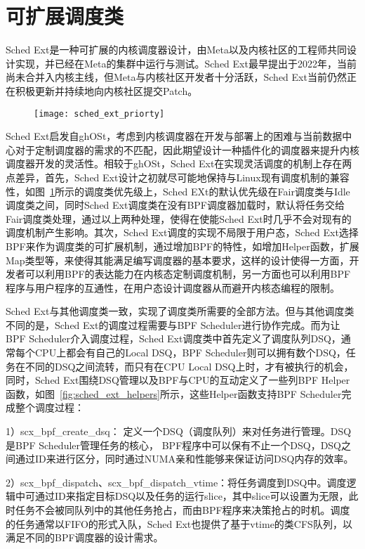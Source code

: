\section{可扩展调度类}

Sched Ext是一种可扩展的内核调度器设计\citep{schedext}，由Meta以及内核社区的工程师共同设计实现，并已经在Meta的集群中运行与测试。Sched Ext最早提出于2022年，当前尚未合并入内核主线，但Meta与内核社区开发者十分活跃，Sched Ext当前仍然正在积极更新并持续地向内核社区提交Patch。

\begin{figure}[!htbp]
    \centering
    \texttt{[image: sched\_ext\_priorty]}
    \label{fig:sched_ext_priorty}
\end{figure}

Sched Ext启发自ghOSt\citep{humphries2021ghost}，考虑到内核调度器在开发与部署上的困难与当前数据中心对于定制调度器的需求的不匹配，因此期望设计一种插件化的调度器来提升内核调度器开发的灵活性。相较于ghOSt，Sched Ext在实现灵活调度的机制上存在两点差异，首先，Sched Ext设计之初就尽可能地保持与Linux现有调度机制的兼容性，如图~\ref{fig:sched_ext_priorty}所示的调度类优先级上，Sched EXt的默认优先级在Fair调度类与Idle调度类之间，同时Sched Ext调度类在没有BPF调度器加载时，默认将任务交给Fair调度类处理，通过以上两种处理，使得在使能Sched Ext时几乎不会对现有的调度机制产生影响。其次，Sched Ext调度的实现不局限于用户态，Sched Ext选择BPF来作为调度类的可扩展机制，通过增加BPF的特性，如增加Helper函数，扩展Map类型等，来使得其能满足编写调度器的基本要求，这样的设计使得一方面，开发者可以利用BPF的表达能力在内核态定制调度机制，另一方面也可以利用BPF程序与用户程序的互通性，在用户态设计调度器从而避开内核态编程的限制。

Sched Ext与其他调度类一致，实现了调度类所需要的全部方法。但与其他调度类不同的是，Sched Ext的调度过程需要与BPF Scheduler进行协作完成。而为让BPF Scheduler介入调度过程，Sched Ext调度类中首先定义了调度队列DSQ，通常每个CPU上都会有自己的Local DSQ，BPF Scheduler则可以拥有数个DSQ，任务在不同的DSQ之间流转，而只有在CPU Local DSQ上时，才有被执行的机会，同时，Sched Ext围绕DSQ管理以及BPF与CPU的互动定义了一些列BPF Helper函数，如图~\ref{fig:sched_ext_helpers}所示，这些Helper函数支持BPF Scheduler完成整个调度过程：

1）scx\_bpf\_create\_dsq： 定义一个DSQ（调度队列）来对任务进行管理。DSQ是BPF Scheduler管理任务的核心， BPF程序中可以保有不止一个DSQ，DSQ之间通过ID来进行区分，同时通过NUMA亲和性能够来保证访问DSQ内存的效率。

2）scx\_bpf\_dispatch、scx\_bpf\_dispatch\_vtime：将任务调度到DSQ中。调度逻辑中可通过ID来指定目标DSQ以及任务的运行slice，其中slice可以设置为无限，此时任务不会被同队列中的其他任务抢占，而由BPF程序来决策抢占的时机。调度的任务通常以FIFO的形式入队，Sched Ext也提供了基于vtime的类CFS队列，以满足不同的BPF调度器的设计需求。

